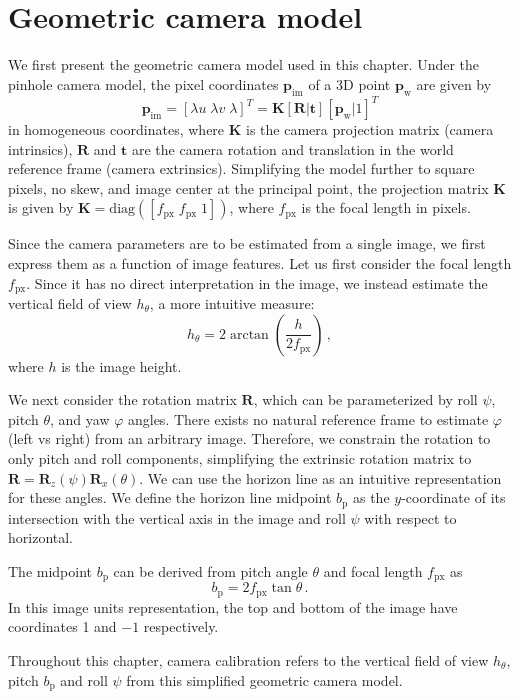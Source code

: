\section{Geometric camera model}
\label{sec:camera-model}

We first present the geometric camera model used in this chapter. 
Under the pinhole camera model, the pixel coordinates $\mathbf{p}_\mathrm{im}$ of a 3D point $\mathbf{p}_\mathrm{w}$ are given by
%
\begin{equation}
\mathbf{p}_{\mathrm{im}} = [\lambda u \; \lambda v \; \lambda]^T = \mathbf{K} \left[\mathbf{R} | \mathbf{t}\right] \left[ \mathbf{p}_{\mathrm{w}} | 1 \right]^T
\end{equation}
%
in homogeneous coordinates, where $\mathbf{K}$ is the camera projection matrix (camera intrinsics), $\mathbf{R}$ and $\mathbf{t}$ are the camera rotation and translation in the world reference frame (camera extrinsics). Simplifying the model further to square pixels, no skew, and image center at the principal point, the projection matrix $\mathbf{K}$ is given by $\mathbf{K} = \mathrm{diag}([f_{\mathrm{px}} \; f_{\mathrm{px}} \; 1])$, where $f_{\mathrm{px}}$ is the focal length in pixels. 

Since the camera parameters are to be estimated from a single image, we first express them as a function of image features. Let us first consider the focal length $f_\mathrm{px}$. Since it has no direct interpretation in the image, we instead estimate the vertical field of view $h_\theta$, a more intuitive measure:
%
\begin{equation}
h_{\theta} = 2 \arctan \left( \frac{ h }{ 2f{_\mathrm{px}} } \right) \,,
\end{equation}
%
where $h$ is the image height.

We next consider the rotation matrix $\mathbf{R}$, which can be parameterized by roll $\psi$, pitch $\theta$, and yaw $\varphi$ angles. There exists no natural reference frame to estimate $\varphi$ (left vs right) from an arbitrary image. Therefore, we constrain the rotation to only pitch and roll components, simplifying the extrinsic rotation matrix to $\mathbf{R} = \mathbf{R}_z(\psi) \mathbf{R}_x(\theta)$. We can use the horizon line as an intuitive representation for these angles. We define the horizon line midpoint $b_{\mathrm{p}}$ as the $y$-coordinate of its intersection with the vertical axis in the image and roll $\psi$ with respect to horizontal.

The midpoint $b_{\mathrm{p}}$ can be derived from pitch angle $\theta$ and focal length $f_{\mathrm{px}}$ as
%
\begin{equation}
b_{\mathrm{p}} = 2 f_{\mathrm{px}} \tan\theta \,.
\label{eq:horizon_midpoint}
\end{equation}
%
In this image units representation, the top and bottom of the image have coordinates 1 and $-1$ respectively. 

Throughout this chapter, camera calibration refers to the vertical field of view $h_{\theta}$, pitch $b_{\mathrm{p}}$ and roll $\psi$ from this simplified geometric camera model.
